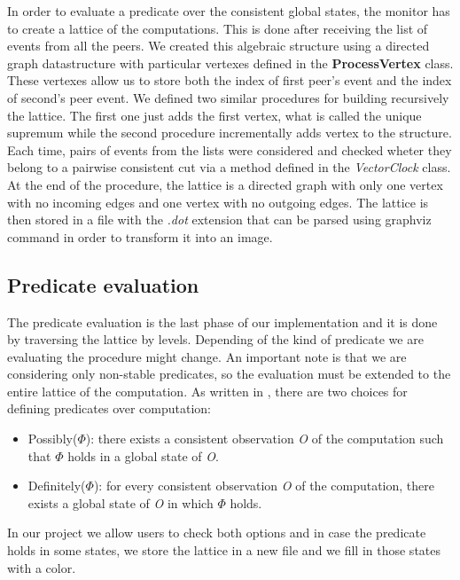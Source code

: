 \documentclass[11pt]{article}
\begin{document}
In order to evaluate a predicate over the consistent global states, the monitor has to create a lattice of the computations. This is done after receiving the list of events from all the peers. We created this algebraic structure using a directed graph datastructure with particular vertexes defined in the \textbf{ProcessVertex} class. These vertexes allow us to store both the index of first peer's event and the index of second's peer event. We defined two similar procedures for building recursively the lattice. The first one just adds the first vertex, what is called the unique supremum while the second procedure incrementally adds vertex to the structure. Each time, pairs of events from the lists were considered and checked wheter they belong to a pairwise consistent cut via a method defined in the \textit{VectorClock} class. At the end of the procedure, the lattice is a directed graph with only one vertex with no incoming edges and one vertex with no outgoing edges. The lattice is then stored in a file with the \textit{.dot} extension that can be parsed using graphviz command in order to transform it into an image.

\subsection{Predicate evaluation}

The predicate evaluation is the last phase of our implementation and it is done by traversing the lattice by levels. Depending of the kind of predicate we are evaluating the procedure might change. An important note is that we are considering only non-stable predicates, so the evaluation must be extended to the entire lattice of the computation. As written in \cite{Babaoglu}, there are two choices for defining predicates over computation:
\begin{itemize}
\item Possibly($\Phi$): there exists a consistent observation \textit{O} of the computation such that $\Phi$ holds in a global state of \textit{O}.
\item Definitely($\Phi$): for every consistent observation \textit{O} of the computation, there exists a global state of \textit{O} in which $\Phi$ holds.
\end{itemize}
In our project we allow users to check both options and in case the predicate holds in some states, we store the lattice in a new file and we fill in those states with a color.
\end{document}
